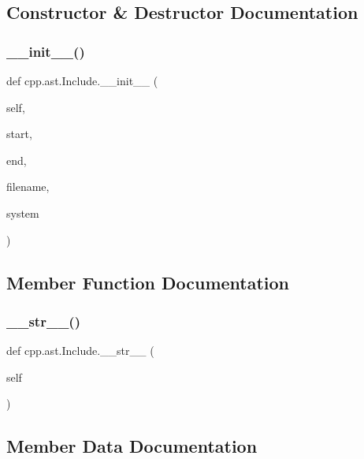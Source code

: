 \subsection{Constructor \& Destructor Documentation}
\mbox{\label{classcpp_1_1ast_1_1Include_a41b000a9f16a9a1840e56a761bb7045c}} 
\subsubsection{\texorpdfstring{\_\_init\_\_()}{\_\_init\_\_()}}
{\footnotesize\ttfamily def cpp.\+ast.\+Include.\+\_\+\+\_\+init\+\_\+\+\_\+ (\begin{DoxyParamCaption}\item[{}]{self,  }\item[{}]{start,  }\item[{}]{end,  }\item[{}]{filename,  }\item[{}]{system }\end{DoxyParamCaption})}



\subsection{Member Function Documentation}
\mbox{\label{classcpp_1_1ast_1_1Include_ad7d9e5e8f46dcb1a91a282e609412a3e}} 
\subsubsection{\texorpdfstring{\_\_str\_\_()}{\_\_str\_\_()}}
{\footnotesize\ttfamily def cpp.\+ast.\+Include.\+\_\+\+\_\+str\+\_\+\+\_\+ (\begin{DoxyParamCaption}\item[{}]{self }\end{DoxyParamCaption})}



\subsection{Member Data Documentation}
\mbox{\label{classcpp_1_1ast_1_1Include_a9ecff64f127655d3c17e9abe4ebe3852}} 
